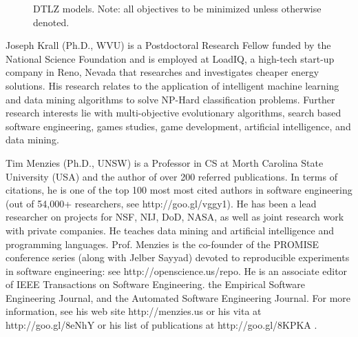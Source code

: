 \documentclass[10pt,journal,compsoc]{IEEEtran}
\begin{document}
\begin{figure}[!t]
\begin{tabular}{ | l | c | l@{~} | c@{~} | }
                \end{tabular}
                \caption[Defining the DTLZ Math Models]{DTLZ models. Note: all objectives
to be minimized unless otherwise denoted.}
        \label{fig:dtlzmodels}

\end{figure}









\newpage

\begin{IEEEbiography}{Joseph Krall}
(Ph.D., WVU)
is a Postdoctoral Research Fellow funded by the National Science Foundation and is employed  at
LoadIQ, a high-tech start-up company in Reno, Nevada that researches and investigates cheaper energy solutions.
His research relates to the application of
intelligent machine learning and data mining algorithms to solve NP-Hard classification problems.
Further research interests lie with multi-objective evolutionary algorithms, 
search based software engineering, games studies, game development, artificial intelligence, and data mining.
\end{IEEEbiography}



\begin{IEEEbiography}{Tim Menzies} (Ph.D., UNSW)
is a Professor in CS at Morth Carolina State University (USA) and  the author of
over 200 referred publications. In terms of citations, he is one of the top 100 most
most cited
authors in  software engineering (out of 54,000+ researchers, see
http://goo.gl/vggy1). He has been a lead researcher on
projects for NSF, NIJ, DoD, NASA, as well as joint research work with
private companies. He teaches data mining and artificial intelligence
and programming languages. Prof. Menzies is the co-founder of the
PROMISE conference series (along with Jelber Sayyad) devoted to reproducible experiments in
software engineering: see http://openscience.us/repo. He is an
associate editor of IEEE Transactions on Software Engineering. the Empirical Software Engineering Journal, and the
Automated Software Engineering Journal.  For more information, see his web site http://menzies.us
or his vita at http://goo.gl/8eNhY or his list of publications at
http://goo.gl/8KPKA .
\end{IEEEbiography}
\end{document}

